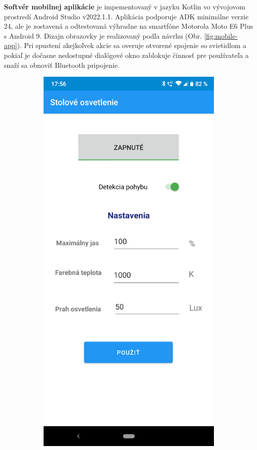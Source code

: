 \documentclass[12pt, a4paper]{article}
\begin{document}
\textbf{Softvér mobilnej aplikácie} je impementovaný v jazyku Kotlin vo vývojovom prostredí Android Studio v2022.1.1. Aplikácia podporuje ADK minimálne verzie 24, ale je zostavená a odtestovaná výhradne na smartfóne Motorola Moto E6 Plus s Android 9. Dizajn obrazovky je realizovaný podľa návrhu (Obr. \ref{fig:mobile-app}). Pri spustení akejkoľvek akcie sa overuje otvorené spojenie so svietidlom a pokiaľ je dočasne nedostupné dialógové okno zablokuje činnosť pre používateľa a snaží sa obnoviť Bluetooth pripojenie.

\begin{figure}[h]
\centering
\begin{subfigure}[b]{0.45\textwidth}
	\centering
	\includegraphics[width=\textwidth]{assets/mobile-app.png}

\end{subfigure}
\end{figure}
\end{document}

